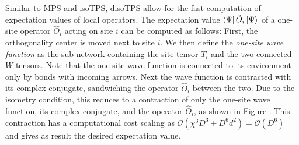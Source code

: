 Similar to MPS and isoTPS, disoTPS allow for the fast computation of expectation values of local operators. The expectation value $\bra{\Psi}\hat{O}_i\ket{\Psi}$ of a one-site operator $\hat{O}_i$ acting on site $i$ can be computed as follows: First, the orthogonality center is moved next to site $i$. We then define the \textit{one-site wave function} as the sub-network containing the site tensor $T_i$ and the two connected $W$-tensors. Note that the one-site wave function is connected to its environment only by bonds with incoming arrows. Next the wave function is contracted with its complex conjugate, sandwiching the operator $\hat{O}_i$ between the two. Due to the isometry condition, this reduces to a contraction of only the one-site wave function, its complex conjugate, and the operator $\hat{O}_i$, as shown in Figure . This contraction has a computational cost scaling as $\mathcal{O}\left(\chi^3 D^3 + D^6d^2\right) = \mathcal{O}(D^6)$ and gives as result the desired expectation value. \par
